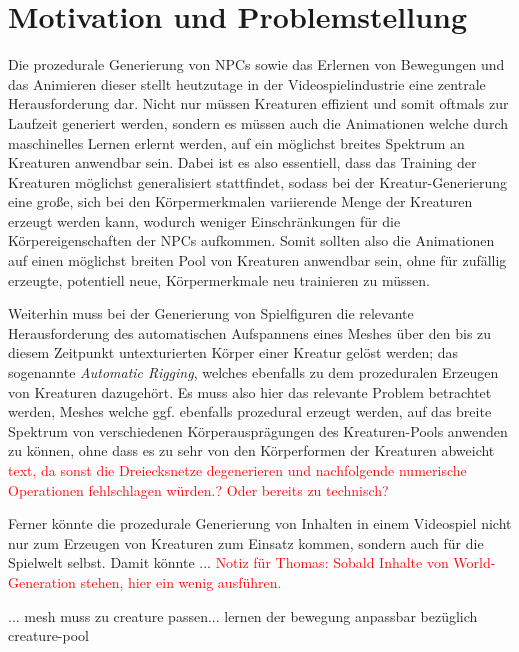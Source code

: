 \section{Motivation und Problemstellung}

Die prozedurale Generierung von NPCs sowie das Erlernen von Bewegungen und das Animieren dieser stellt heutzutage in der Videospielindustrie eine zentrale Herausforderung dar. Nicht nur müssen Kreaturen effizient und somit oftmals zur Laufzeit generiert werden, sondern es müssen auch die Animationen welche durch maschinelles Lernen erlernt werden, auf ein möglichst breites Spektrum an Kreaturen anwendbar sein. Dabei ist es also essentiell, dass das Training der Kreaturen möglichst generalisiert stattfindet, sodass bei der Kreatur-Generierung eine große, sich bei den Körpermerkmalen variierende Menge der Kreaturen erzeugt werden kann, wodurch weniger Einschränkungen für die Körpereigenschaften der NPCs aufkommen. Somit sollten also die Animationen auf einen möglichst breiten Pool von Kreaturen anwendbar sein, ohne für zufällig erzeugte, potentiell neue, Körpermerkmale neu trainieren zu müssen.

Weiterhin muss bei der Generierung von Spielfiguren die relevante Herausforderung des automatischen Aufspannens eines Meshes über den bis zu diesem Zeitpunkt untexturierten Körper einer Kreatur gelöst werden; das sogenannte \textit{Automatic Rigging}, welches ebenfalls zu dem prozeduralen Erzeugen von Kreaturen dazugehört. Es muss also hier das relevante Problem betrachtet werden, Meshes welche ggf. ebenfalls prozedural erzeugt werden, auf das breite Spektrum von verschiedenen Körperausprägungen des Kreaturen-Pools anwenden zu können, ohne dass es zu sehr von den Körperformen der Kreaturen abweicht \textcolor{red}{text, da sonst die Dreiecksnetze degenerieren und nachfolgende numerische Operationen fehlschlagen würden.? Oder bereits zu technisch?}

Ferner könnte die prozedurale Generierung von Inhalten in einem Videospiel nicht nur zum Erzeugen von Kreaturen zum Einsatz kommen, sondern auch für die Spielwelt selbst. Damit könnte ... \textcolor{red}{Notiz für Thomas: Sobald Inhalte von World-Generation stehen, hier ein wenig ausführen.}


  ... mesh muss zu creature passen... lernen der bewegung anpassbar bezüglich creature-pool